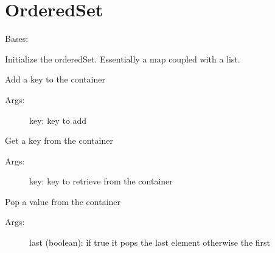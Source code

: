 \documentclass[letterpaper,10pt,english]{sphinxmanual}
\begin{document}
\chapter{OrderedSet}
\label{orderedSet:module-ctools.OrderedSet}\label{orderedSet::doc}\label{orderedSet:orderedset}

\begin{fulllineitems}
\label{orderedSet:ctools.OrderedSet.OrderedSet}
Bases: 

Initialize the orderedSet. Essentially a map coupled with a list.


\begin{fulllineitems}
\label{orderedSet:ctools.OrderedSet.OrderedSet.add}
Add a key to the container
\begin{description}
\item[{Args:}] \leavevmode
key: key to add

\end{description}

\end{fulllineitems}



\begin{fulllineitems}
\label{orderedSet:ctools.OrderedSet.OrderedSet.get}
Get a key from the container
\begin{description}
\item[{Args:}] \leavevmode
key: key to retrieve from the container

\end{description}

\end{fulllineitems}



\begin{fulllineitems}
\label{orderedSet:ctools.OrderedSet.OrderedSet.pop}
Pop a value from the container
\begin{description}
\item[{Args:}] \leavevmode
last (boolean): if true it pops the last element otherwise the first


\end{description}
\end{fulllineitems}
\end{fulllineitems}
\end{document}
